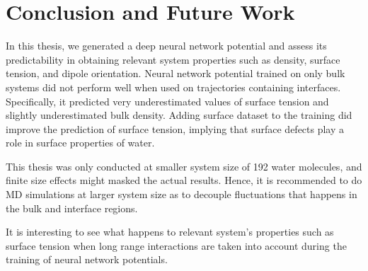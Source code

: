 \chapter{Conclusion and Future Work}

In this thesis, we generated a deep neural network potential and assess its
predictability in obtaining relevant system properties such as density, surface
tension, and dipole orientation. Neural network potential trained on only bulk
systems did not perform well when used on trajectories containing interfaces.
Specifically, it predicted very underestimated values of surface tension and
slightly underestimated bulk density. Adding surface dataset to the training
did improve the prediction of surface tension, implying that surface defects
play a role in surface properties of water.

This thesis was only conducted at smaller system size of 192 water molecules,
and finite size effects might masked the actual results. Hence, it is
recommended to do MD simulations at larger system size as to decouple
fluctuations that happens in the bulk and interface regions.

It is interesting to see what happens to relevant system's properties such as
surface tension when long range interactions are taken into account during
the training of neural network potentials.